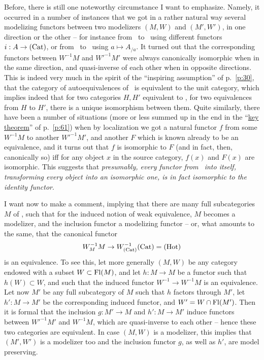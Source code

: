 Before, there is still one noteworthy circumstance I want to
emphasize. Namely, it occurred in a number of instances that we got in
a rather natural way several modelizing functors between two
modelizers $(M,W)$ and $(M',W')$, in one direction or the other -- for
instance from \Cat\ to \Ahat\ using different functors $i:A\to{\ensuremath{(\mathrm{Cat})}}$,
or from \Ahat\ to \Cat\ using $a\mapsto A_{/a}$. It turned out that
the corresponding functors between $W^{-1}M$ and $W'^{-1}M'$ were
always canonically isomorphic when in the same direction, and
quasi-inverse of each other when in opposite directions. This is
indeed very much in the spirit of the ``inspiring assumption'' of p.\
\ref{p:30}, that the category of autoequivalences of \Hot\
is equivalent to the unit category, which implies indeed that for two
categories $H,H'$ equivalent to \Hot, for two equivalences from $H$ to
$H'$, there is a unique isomorphism between them. Quite similarly,
there have been a number of situations (more or less summed up in the
end in the ``\hyperref[thm:keyresult]{key theorem}'' of p.\
\ref{p:61}) when by localization we got a natural functor
$f$ from some $W^{-1}M$ to another $W'^{-1}M'$, and another $F$ which
is known already to be an equivalence, and it turns out that $f$ is
isomorphic to $F$ (and in fact, then, canonically so) if{f} for any
object $x$ in the source category, $f(x)$ and $F(x)$ are
isomorphic. This suggests that \emph{presumably, every functor
  from \Hot\ into itself, transforming every object into an isomorphic
  one, is in fact isomorphic to the identity functor}.

I want now to make a comment, implying that there are many full
subcategories $M$ of \Cat, such that for the induced notion of weak
equivalence, $M$ becomes a modelizer, and the inclusion functor a
modelizing functor -- or, what amounts to the same, that the canonical
functor
\[W_M^{-1}M \to W_{(\mathrm{Cat})}^{-1}{(\mathrm{Cat})} = {(\mathrm{Hot})}\]
is an equivalence. To see this, let more generally $(M,W)$ be any
category endowed with a subset $W\subset\operatorname{Fl}(M)$, and let $h:M\to M$ be
a functor such that $h(W)\subset W$, and such that the induced functor
$W^{-1}\to W^{-1}M$ is an equivalence. Let now $M'$ be any full
subcategory of $M$ such that $h$ factors through $M'$, let $h' : M\to
M'$ be the corresponding induced functor, and $W'=W\mathbin{\cap}
\operatorname{Fl}(M')$. Then it is formal that the inclusion $g:M'\to
M$\pspage{74} and $h':M\to M'$ induce functors between $W'^{-1}M'$
and $W^{-1}M$, which are quasi-inverse to each other -- hence these
two categories are equivalent. In case $(M,W)$ is a modelizer, this
implies that $(M',W')$ is a modelizer too and the inclusion functor
$g$, as well as $h'$, are model preserving.

